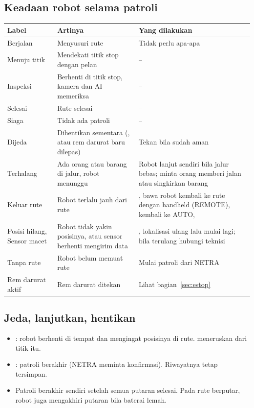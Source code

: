 \documentclass[11pt]{article}
\begin{document}
\subsection{Keadaan robot selama patroli}
\label{sec:states}
\begin{tabularx}{\linewidth}{@{}B{3.0cm}YY@{}}
\toprule
Label & Artinya & Yang dilakukan \\
\midrule
Berjalan & Menyusuri rute & Tidak perlu apa-apa \\
Menuju titik & Mendekati titik stop dengan pelan & -- \\
Inspeksi & Berhenti di titik stop, kamera dan AI memeriksa & -- \\
Selesai & Rute selesai & -- \\
Siaga & Tidak ada patroli & -- \\
Dijeda & Dihentikan sementara (, atau rem darurat baru dilepas) & Tekan  bila sudah aman \\
Terhalang & Ada orang atau barang di jalur, robot menunggu & Robot lanjut sendiri bila jalur bebas; minta orang memberi jalan atau singkirkan barang \\
Keluar rute & Robot terlalu jauh dari rute & , bawa robot kembali ke rute dengan handheld (REMOTE), kembali ke AUTO,  \\
Posisi hilang, Sensor macet & Robot tidak yakin posisinya, atau sensor berhenti mengirim data & , lokalisasi ulang lalu mulai lagi; bila terulang hubungi teknisi \\
Tanpa rute & Robot belum memuat rute & Mulai patroli dari NETRA \\
Rem darurat aktif & Rem darurat ditekan & Lihat bagian~\ref{sec:estop} \\
\bottomrule
\end{tabularx}

\subsection{Jeda, lanjutkan, hentikan}
\begin{itemize}
  \item {}: robot berhenti di tempat dan mengingat posisinya di rute.  meneruskan
        dari titik itu.
  \item {}: patroli berakhir (NETRA meminta konfirmasi). Riwayatnya tetap tersimpan.
  \item Patroli berakhir sendiri setelah semua putaran selesai. Pada rute berputar, robot juga
        mengakhiri putaran bila baterai lemah.
\end{itemize}
\end{document}
